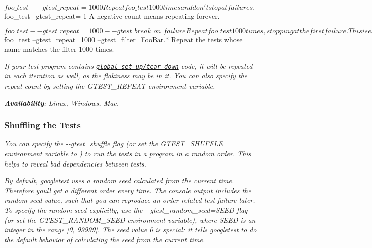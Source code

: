 {\itshape 
\begin{DoxyCode}
$ foo\_test --gtest\_repeat=1000
Repeat foo\_test 1000 times and don't stop at failures.

$ foo\_test --gtest\_repeat=-1
A negative count means repeating forever.

$ foo\_test --gtest\_repeat=1000 --gtest\_break\_on\_failure
Repeat foo\_test 1000 times, stopping at the first failure.  This
is especially useful when running under a debugger: when the test
fails, it will drop into the debugger and you can then inspect
variables and stacks.

$ foo\_test --gtest\_repeat=1000 --gtest\_filter=FooBar.*
Repeat the tests whose name matches the filter 1000 times.
\end{DoxyCode}
}

{\itshape If your test program contains \href{#global-set-up-and-tear-down}{\tt global set-\/up/tear-\/down} code, it will be repeated in each iteration as well, as the flakiness may be in it. You can also specify the repeat count by setting the {\ttfamily G\+T\+E\+S\+T\+\_\+\+R\+E\+P\+E\+AT} environment variable.}

{\itshape {\bfseries Availability}\+: Linux, Windows, Mac.}

{\itshape \subsubsection*{Shuffling the Tests}}

{\itshape }

{\itshape You can specify the {\ttfamily -\/-\/gtest\+\_\+shuffle} flag (or set the {\ttfamily G\+T\+E\+S\+T\+\_\+\+S\+H\+U\+F\+F\+LE} environment variable to {}) to run the tests in a program in a random order. This helps to reveal bad dependencies between tests.}

{\itshape By default, googletest uses a random seed calculated from the current time. Therefore you\textquotesingle{}ll get a different order every time. The console output includes the random seed value, such that you can reproduce an order-\/related test failure later. To specify the random seed explicitly, use the {\ttfamily -\/-\/gtest\+\_\+random\+\_\+seed=S\+E\+ED} flag (or set the {\ttfamily G\+T\+E\+S\+T\+\_\+\+R\+A\+N\+D\+O\+M\+\_\+\+S\+E\+ED} environment variable), where {\ttfamily S\+E\+ED} is an integer in the range \mbox{[}0, 99999\mbox{]}. The seed value 0 is special\+: it tells googletest to do the default behavior of calculating the seed from the current time.}

